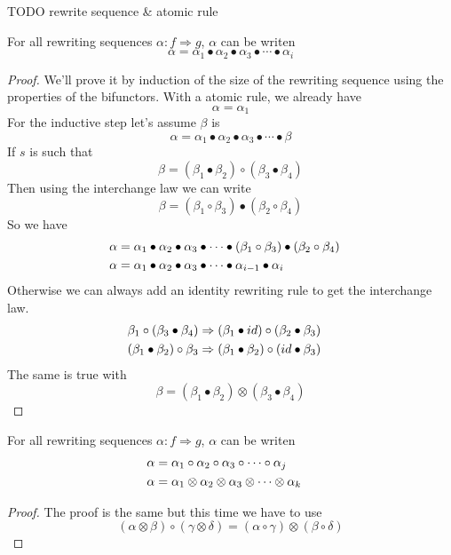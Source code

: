 \documentclass[a4paper]{article}
\begin{document}
\begin{example}
TODO rewrite sequence \& atomic rule
\end{example}

\begin{proposition}
For all rewriting sequences $\alpha: f \Rightarrow g$, $\alpha$ can be writen
\[
\alpha = \alpha_1 \bullet \alpha_2 \bullet \alpha_3 \bullet \cdots \bullet
  \alpha_i
\]

\begin{proof}
We'll prove it by induction of the size of the rewriting sequence using the
  properties of the bifunctors.
With a atomic rule, we already have
\[
\alpha = \alpha_1
\]
For the inductive step let's assume $\beta$ is
\[
\alpha = \alpha_1 \bullet \alpha_2 \bullet \alpha_3 \bullet \cdots \bullet \beta
\]
If $s$ is such that
\[
\beta = (\beta_1 \bullet \beta_2) \circ (\beta_3 \bullet \beta_4)
\]
Then using the interchange law we can write
\[
\beta = (\beta_1 \circ \beta_3) \bullet (\beta_2 \circ \beta_4)
\]
So we have 
\begin{align}
\alpha &= \alpha_1 \bullet \alpha_2 \bullet \alpha_3 \bullet \cdots \bullet
  (\beta_1 \circ \beta_3) \bullet (\beta_2 \circ \beta_4) \cr
\alpha &= \alpha_1 \bullet \alpha_2 \bullet \alpha_3 \bullet \cdots \bullet
  \alpha_{i - 1} \bullet \alpha_i
\end{align}
Otherwise we can always add an identity rewriting rule to get the interchange
  law.
\begin{align}
\beta_1 \circ (\beta_3 \bullet \beta_4) &\Rightarrow (\beta_1 \bullet id) \circ
  (\beta_2 \bullet \beta_3) \cr
(\beta_1 \bullet \beta_2) \circ \beta_3 &\Rightarrow (\beta_1 \bullet \beta_2)
  \circ (id \bullet \beta_3)
\end{align}
The same is true with
\[
\beta = (\beta_1 \bullet \beta_2) \otimes (\beta_3 \bullet \beta_4)
\]
\end{proof}
\end{proposition}

\begin{proposition}
For all rewriting sequences $\alpha: f \Rightarrow g$, $\alpha$ can be writen
\begin{align}
\alpha &= \alpha_1 \circ \alpha_2 \circ \alpha_3 \circ \cdots \circ \alpha_j \cr
\alpha &= \alpha_1 \otimes \alpha_2 \otimes \alpha_3 \otimes \cdots \otimes
  \alpha_k
\end{align}

\begin{proof}
The proof is the same but this time we have to use
\[
(\alpha \otimes \beta) \circ (\gamma \otimes \delta) = (\alpha \circ \gamma)
  \otimes (\beta \circ \delta)
\]
\end{proof}
\end{proposition}
\end{document}
